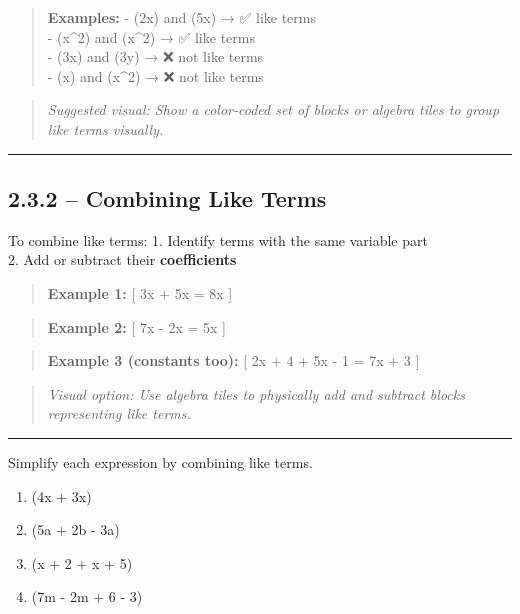 \documentclass[
  letterpaper,
  DIV=11,
  numbers=noendperiod]{scrreprt}
\providecommand{\tightlist}{%
  \setlength{\itemsep}{0pt}\setlength{\parskip}{0pt}}
\begin{document}
\begin{quote}
\textbf{Examples:} - (2x) and (5x) → ✅ like terms\\
- (x\^{}2) and (x\^{}2) → ✅ like terms\\
- (3x) and (3y) → ❌ not like terms\\
- (x) and (x\^{}2) → ❌ not like terms
\end{quote}

\begin{quote}
\emph{Suggested visual: Show a color-coded set of blocks or algebra
tiles to group like terms visually.}
\end{quote}

\begin{center}\rule{0.5\linewidth}{0.5pt}\end{center}

\subsection*{2.3.2 -- Combining Like
Terms}\label{combining-like-terms-1}

To combine like terms: 1. Identify terms with the same variable part\\
2. Add or subtract their \textbf{coefficients}

\begin{quote}
\textbf{Example 1:} {[} 3x + 5x = 8x {]}
\end{quote}

\begin{quote}
\textbf{Example 2:} {[} 7x - 2x = 5x {]}
\end{quote}

\begin{quote}
\textbf{Example 3 (constants too):} {[} 2x + 4 + 5x - 1 = 7x + 3 {]}
\end{quote}

\begin{quote}
\emph{Visual option: Use algebra tiles to physically add and subtract
blocks representing like terms.}
\end{quote}

\begin{center}\rule{0.5\linewidth}{0.5pt}\end{center}

Simplify each expression by combining like terms.

\begin{enumerate}
\def\labelenumi{\arabic{enumi}.}
\tightlist
\item
  (4x + 3x)\\
\item
  (5a + 2b - 3a)\\
\item
  (x + 2 + x + 5)\\
\item
  (7m - 2m + 6 - 3)\\
\end{enumerate}
\end{document}
